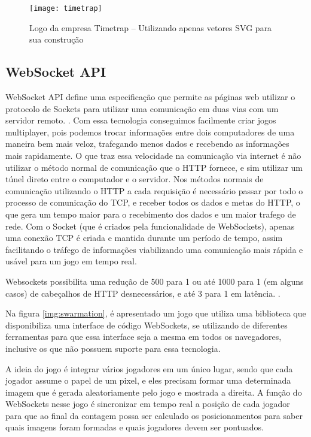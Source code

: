 \begin{figure}[H]
  \centering
	\texttt{[image: timetrap]}
  \caption{Logo da empresa Timetrap {--} Utilizando apenas vetores SVG para sua construção}
  \label{img:timetrap}
\end{figure}

\clearpage


\subsection{WebSocket API}

WebSocket API define uma especificação que permite as páginas web
utilizar o protocolo de Sockets para utilizar uma comunicação em duas
vias com um servidor remoto. \cite{w3cwebsockets}. Com essa tecnologia
conseguimos facilmente criar jogos multiplayer, pois podemos
trocar informações entre dois computadores de uma maneira bem mais
veloz, trafegando menos dados e recebendo as informações mais
rapidamente.
O que traz essa velocidade na comunicação via internet é não utilizar
o método normal de comunicação que o HTTP fornece, e sim utilizar um
túnel direto entre o computador e o servidor.
Nos métodos normais de comunicação utilizando o HTTP a cada requisição
é necessário passar por todo o processo de comunicação do TCP, e
receber todos os dados e metas do HTTP, o que gera um tempo maior para
o recebimento dos dados e um maior trafego de rede. Com o Socket (que
é criados pela funcionalidade de WebSockets), apenas uma conexão TCP é
criada e mantida durante um período de tempo, assim facilitando o
tráfego de informações viabilizando uma comunicação mais rápida e
usável para um jogo em tempo real.

Websockets possibilita uma redução de 500 para 1 ou até 1000 para 1
(em alguns casos) de cabeçalhos de HTTP desnecessários, e até 3 para 1
em latência. \cite{lubbers2010pro}.

Na figura \ref{img:swarmation}, é apresentado um jogo que utiliza
uma biblioteca que disponibiliza uma interface de código WebSockets,
se utilizando de diferentes ferramentas para que essa interface seja a mesma em
todos os navegadores, inclusive os que não possuem suporte para essa
tecnologia.

A ideia do jogo é integrar vários jogadores em um único lugar, sendo que
cada jogador assume o papel de um pixel, e eles precisam formar uma
determinada imagem que é gerada aleatoriamente pelo jogo e mostrada a
direita. A função do WebSockets nesse jogo é sincronizar em tempo real a
posição de cada jogador para que ao final da contagem possa ser
calculado os posicionamentos para saber quais imagens foram formadas e
quais jogadores devem ser pontuados.

